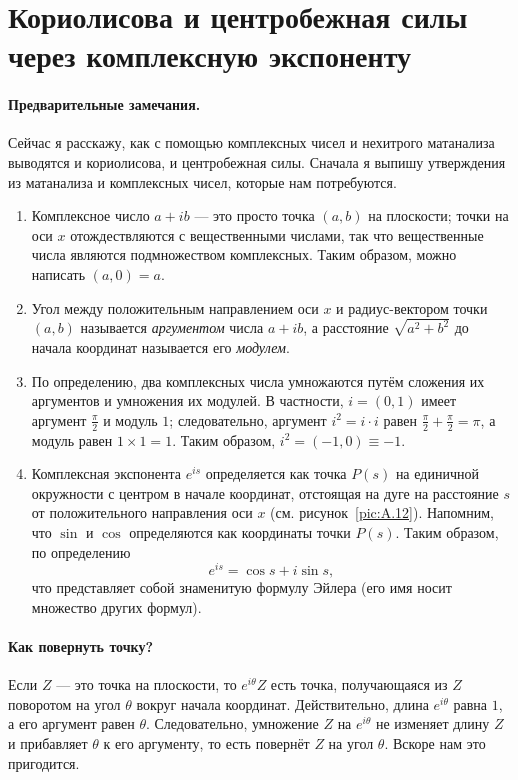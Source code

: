\section{Кориолисова и центробежная силы через комплексную экспоненту}\label{sec:A.9}

\paragraph{Предварительные замечания.}
Сейчас я расскажу, как с помощью комплексных чисел и нехитрого матанализа выводятся и кориолисова, и центробежная силы.
Сначала я выпишу утверждения из матанализа и комплексных чисел, которые нам потребуются.

\begin{enumerate}
\item Комплексное число $a + ib$ — это просто точка $(a, b)$ на плоскости;
точки на оси $x$ отождествляются с вещественными числами, так что вещественные числа являются подмножеством комплексных.
Таким образом, можно написать $(a, 0) = a$.

\item Угол между положительным направлением оси $x$ и радиус-вектором точки $(a, b)$ называется
\textit{аргументом} числа $a + ib$, а расстояние $\sqrt{a^2 + b^2}$ до начала координат называется
его \textit{модулем}.

\item По определению, два комплексных числа умножаются путём сложения их аргументов
и умножения их модулей. В частности, $i = (0, 1)$ имеет аргумент $\tfrac\pi2$
и модуль $1$; следовательно, аргумент $i^2 = i \cdot i$ равен
$\tfrac\pi2+\tfrac\pi2=\pi$, а модуль равен $1\times1=1$.
Таким образом, $i^2=(-1,0)\equiv-1$.

\item Комплексная экспонента $e^{is}$ определяется как точка $P(s)$ на единичной окружности
с центром в начале координат, отстоящая на дуге на расстояние $s$ от положительного направления оси $x$ (см. рисунок~\ref{pic:A.12}).
Напомним, что $\sin$ и $\cos$ определяются как координаты точки $P(s)$.
Таким образом, по определению
\[
e^{is} = \cos s + i \sin s,
\]
что представляет собой знаменитую формулу Эйлера (его имя носит множество других формул).

\end{enumerate}

\paragraph{Как повернуть точку?}
Если $Z$ — это точка на плоскости, то
$e^{i\theta} Z$ есть точка, получающаяся из $Z$ поворотом на угол $\theta$ вокруг начала координат.
Действительно, длина $e^{i\theta}$ равна $1$, а его аргумент равен $\theta$.
Следовательно, умножение $Z$ на $e^{i\theta}$ не изменяет длину $Z$ и прибавляет $\theta$ к его аргументу, то есть повернёт $Z$ на угол $\theta$.
Вскоре нам это пригодится.

